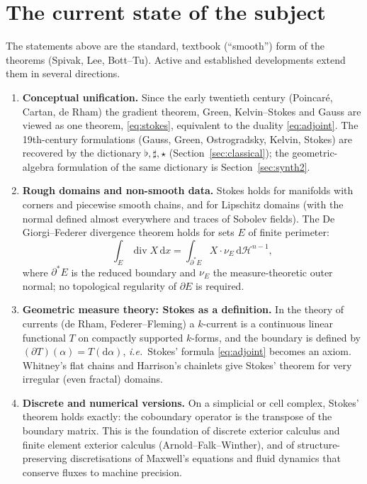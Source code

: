 \documentclass[11pt,a4paper]{article}
\numberwithin{equation}{section}
\theoremstyle{definition}
\theoremstyle{plain}
\newcommand{\dd}{\mathrm{d}}
\newcommand{\ie}{\emph{i.e.}\ }
\newcommand{\hodge}{\star}
\begin{document}
\section{The current state of the subject}\label{sec:current}

The statements above are the standard, textbook (``smooth'') form of the theorems (Spivak, Lee, Bott--Tu). Active and established developments extend them in several directions.

\begin{enumerate}
\item \textbf{Conceptual unification.} Since the early twentieth century (Poincar\'e, Cartan, de Rham) the gradient theorem, Green, Kelvin--Stokes and Gauss are viewed as one theorem, \eqref{eq:stokes}, equivalent to the duality \eqref{eq:adjoint}. The 19th-century formulations (Gauss, Green, Ostrogradsky, Kelvin, Stokes) are recovered by the dictionary $\flat,\sharp,\hodge$ (Section~\ref{sec:classical}); the geometric-algebra formulation of the same dictionary is Section~\ref{sec:synth2}.
\item \textbf{Rough domains and non-smooth data.} Stokes holds for manifolds with corners and piecewise smooth chains, and for Lipschitz domains (with the normal defined almost everywhere and traces of Sobolev fields). The De Giorgi--Federer divergence theorem holds for sets $E$ of finite perimeter:
\[
\int_E\operatorname{div}X\,\dd x=\int_{\partial^*E}X\cdot\nu_E\,\dd\mathcal H^{n-1},
\]
where $\partial^*E$ is the reduced boundary and $\nu_E$ the measure-theoretic outer normal; no topological regularity of $\partial E$ is required.
\item \textbf{Geometric measure theory: Stokes as a definition.} In the theory of currents (de Rham, Federer--Fleming) a $k$-current is a continuous linear functional $T$ on compactly supported $k$-forms, and the boundary is defined by $(\partial T)(\alpha)=T(\dd\alpha)$, \ie Stokes' formula \eqref{eq:adjoint} becomes an axiom. Whitney's flat chains and Harrison's chainlets give Stokes' theorem for very irregular (even fractal) domains.
\item \textbf{Discrete and numerical versions.} On a simplicial or cell complex, Stokes' theorem holds exactly: the coboundary operator is the transpose of the boundary matrix. This is the foundation of discrete exterior calculus and finite element exterior calculus (Arnold--Falk--Winther), and of structure-preserving discretisations of Maxwell's equations and fluid dynamics that conserve fluxes to machine precision.

\end{enumerate}
\end{document}

